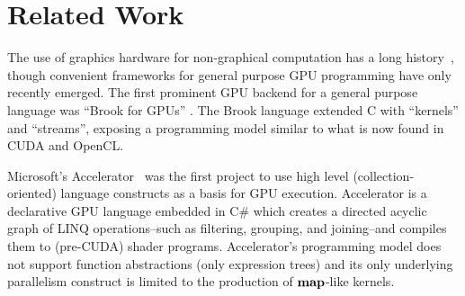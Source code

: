 \documentclass[preprint]{sigplanconf}
\begin{document}
\section{Related Work}
\label{RelatedWork}
The use of graphics hardware for non-graphical computation has a  long
history~\cite{Lengyel90}, though convenient frameworks for general purpose GPU
programming have only recently emerged. The first prominent GPU backend for a
general purpose language was ``Brook for GPUs'' \cite{Buck04}. The Brook
language extended C with ``kernels'' and
``streams'', exposing a programming model similar to what is now found in CUDA
and OpenCL.

Microsoft's Accelerator~\cite{Tard06} was the first project to use high level
(collection-oriented) language constructs as a basis for GPU execution.
Accelerator is a declarative GPU language embedded in C\# which creates a
directed acyclic graph of LINQ operations--such as filtering, grouping, and
joining--and compiles them to
(pre-CUDA) shader programs. Accelerator's programming model does not support
function abstractions (only expression trees) and its only underlying
parallelism construct is limited to the production of $\mbox{\textbf{map}}$-like kernels. 
\end{document}
